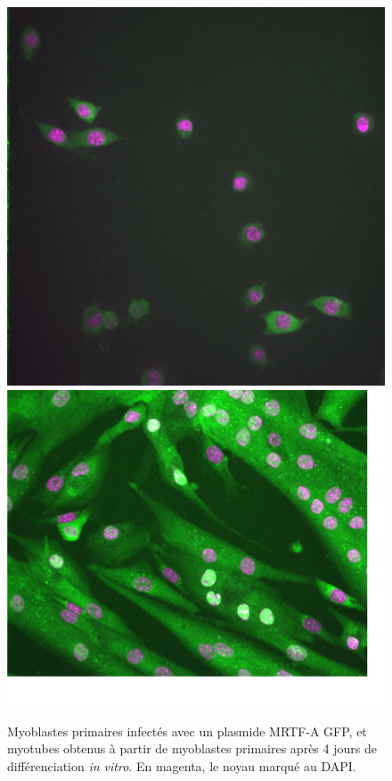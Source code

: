 \begin{figure}
\includegraphics[scale=0.25]{Figures/Myocytes.png} \includegraphics[scale=0.5]{Figures/Myotubes.png} 
\caption{Myoblastes primaires infectés avec un plasmide MRTF-A GFP, et myotubes obtenus à partir de myoblastes primaires après 4 jours de différenciation \textit{in vitro}. En magenta, le noyau marqué au DAPI.}
\end{figure}


